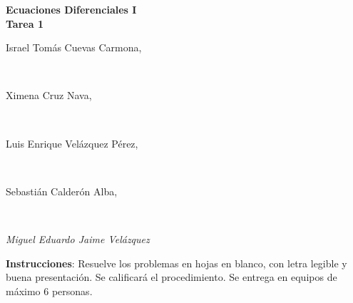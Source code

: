 \documentclass[12pt,a4paper]{article}
\begin{document}
\newcommand{\pr}[1]{\left( #1 \right)}
\newcommand{\nr}[1]{\left| #1 \right|}
\newcommand{\cc}[1]{\cancel{#1}}
\newcommand{\dx}[1]{\dfrac{d#1}{dx}}

\begin{center}
{\Large\textbf{Ecuaciones Diferenciales I}}\\
\vspace{3mm}
{\Large \bf Tarea 1}\\
\vspace{3mm}
\begin{large} Israel Tomás Cuevas Carmona,\end{large}\\
\begin{large} Ximena Cruz Nava,\end{large}\\
\begin{large} Luis Enrique Velázquez Pérez,\end{large}\\
\begin{large} Sebastián Calderón Alba,\end{large}\\
\begin{large}\textit{Miguel Eduardo Jaime Velázquez}\end{large}
\end{center}
{\bf Instrucciones}: Resuelve los problemas en hojas en blanco, con letra legible y buena presentación. Se calificará el procedimiento. Se entrega en equipos de máximo 6 personas. 










\end{document}
